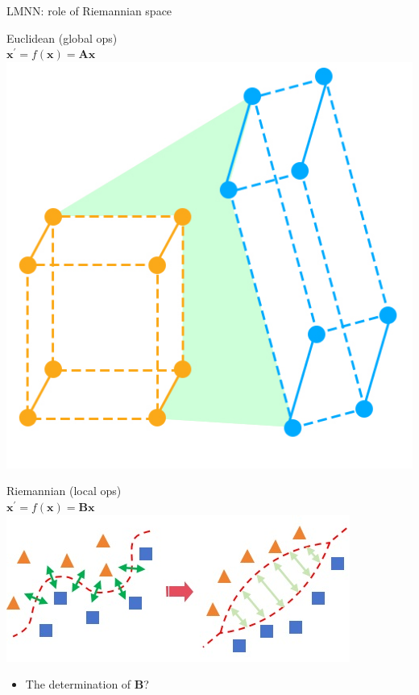 \documentclass[11pt]{beamer}
\begin{document}
\begin{frame}{LMNN: role of Riemannian space}
	\begin{minipage}[t]{0.5\textwidth}
		Euclidean (global ops)\\
		$\boldsymbol{x}^\prime = f(\boldsymbol{x}) = \boldsymbol{Ax}$
		\centering
		\includegraphics[scale=0.85]{matrix-trans.jpg}
    \end{minipage}%
    \hfill
    \begin{minipage}[t]{0.45\textwidth}
    	Riemannian (local ops)\\
    	$\boldsymbol{x}^\prime = f(\boldsymbol{x}) = \boldsymbol{Bx}$
    	\centering
    	\includegraphics[scale=0.85]{riemannian-trans.jpg}
    	\begin{itemize}
    		\item The determination of $\boldsymbol{B}$?
    	\end{itemize}
    \end{minipage}
\end{frame}
\end{document}
